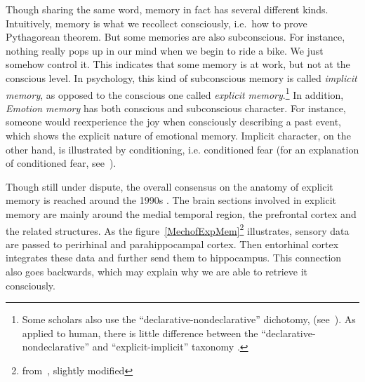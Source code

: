 \documentclass{article}
\begin{document}
Though sharing the same word, memory in fact has several different kinds. Intuitively, memory is what we recollect consciously, i.e.\ how to prove Pythagorean theorem. But some memories are also subconscious. For instance, nothing really pops up in our mind when we begin to ride a bike. We just somehow control it. This indicates that some memory is at work, but not at the conscious level. In psychology, this kind of subconscious memory is called \textit{implicit memory}, as opposed to the conscious one called \textit{explicit memory}.\footnote{Some scholars also use the ``declarative-nondeclarative'' dichotomy, (see~\cite{michaelianMemory2017}). As applied to human, there is little difference between the ``declarative-nondeclarative'' and ``explicit-implicit'' taxonomy \autocite[p.480]{kolbIntroductionBrainBehavior2019}.} In addition, \textit{Emotion memory} has both conscious and subconscious character. For instance, someone would reexperience the joy when consciously describing a past event, which shows the explicit nature of emotional memory. Implicit character, on the other hand, is illustrated by conditioning, i.e. conditioned fear (for an explanation of conditioned fear, see~\cite[p.478]{kolbIntroductionBrainBehavior2019}). 

Though still under dispute, the overall consensus on the anatomy of explicit memory is reached around the 1990s \autocite[p. 207]{kolbIntroductionBrainBehavior2019}. The brain sections involved in explicit memory are mainly around the medial temporal region, the prefrontal cortex and the related structures. As the figure~\ref{MechofExpMem}\footnote{from~\cite[p. 207]{kolbIntroductionBrainBehavior2019}, slightly modified} illustrates, sensory data are passed to perirhinal and parahippocampal cortex. Then entorhinal cortex integrates these data and further send them to hippocampus. This connection also goes backwards, which may explain why we are able to retrieve it consciously. 
\end{document}
